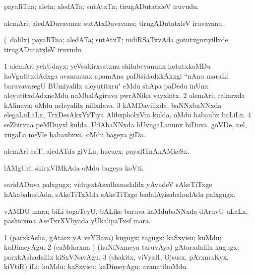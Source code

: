 {\bentry
{} 
\gl{\nA}
\expl{}
\bmng
payaRTna; aleta; aledATa; sutAtxTa; tirugADutatxleV iruvudu. 
\emng
\eentry

\bentry
{} 
\gl{\nA}
\expl{}
\bmng
alemAri; aledADuvavanu; sutAtxDuvavanu; tirugADutatxleV iruvavanu. 
\emng
\eentry

\bentry
{} 
\gl{\nA}
\expl{}
\bmng
(\kanmu\ \bava dalilx) payaRTna; aledATa; sutAtxT; nidiRSaTxvAda gotutxguriyillxde tirugADutatxleV iruvudu. 
\emng
\eentry

\bentry
{}
\gl{\nA}
\expl{}
\bmng
\bnum
\num{1} alemAri yehUdayx; yeVsukirxsatxnu shilubeyanunx hotutxkoMDu hoVgutitxdAdxga avananunx apamAna paDisidadxkAkxgi ``nAnu maraLi baruvavaregU BUmiyalilx aleyutitxru" eMdu shApa paDedu inUnx aleyutitxdAdxneMdu naMbalAgiruva pwrANika vayxkitx. 
\num{2} alemAri; cakarxda kAlinava; oMdu neleyalilx nillxdava. 
\num{3} kAMDavillxda, baNNxbaNNxda elegaLuLaLx, TrxDesAkxYxTiya AlibxpholxVra kulda, oMdu habaubx baLiLx. 
\num{4} seZbirxna peMDuyxl kulda, UdAbaNNxda hUvugaLanunx biDuva, goVDe, nel, \mo vugaLa meVle habaubxva, oMdu bageya giDa. 
\enum
\emng
\eentry

\bentry
{} 
\gl{\nA}
\expl{}
\bmng
{} 
\emng
\eentry

\bentry
{} 
\gl{\nA}
\expl{}
\bmng
alemAri caT; aledATda giVLu, hucucx; payaRTnAkAMkeSx. 
\emng
\eentry

\bentry
{} 
\gl{\nA}
\expl{}
\bmng
lAMgUrf; shirxVlMkAda oMdu bageya koVti. 
\emng
\eentry

\bentry
{} 
\gl{\nA}
\expl{}
\bmng
saridADuva palxgugx; viduyxtAsxdhanadalilx yAvudeV sAkeTiTxge hAkabahudAda, sAkeTiTxMda sAkeTiTxge badalAyisabahudAda palxgugx. 
\emng
\eentry

\bentry
{} 
\gl{\nA}
\expl{}
\bmng
vAMDU mara; biLi togaTeyU, bALike baruva kaMdubaNNxda dAruvU uLaLx, pashicxma AseTxrXVliyada yUkalipaTxsf mara. 
\emng
\eentry

\bentry
{} 
\gl{\akirx}
\expl{}
\bmng
\bnum
\num{1} (parxkAsha, gAtarx yA veYBava) kugugx; tagugx; kaSxyisu; kuMdu; kaDimeyAgu. 
\num{2} (caMdarxna \vi) (huNiNxmeya taruvAya) gAtarxdalilx kugugx; parxkAshadalilx kiSxVNavAgu. 
\num{3} (shakitx, viVyaR, Ojsusx, pArxmuKyx, kiVtiR) iLi; kuMdu; kaSxyisu; kaDimeyAgu; avanatihoMdu. 
\enum
\emng
\eentry

}
